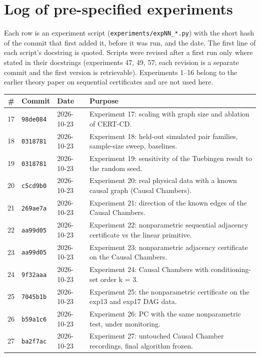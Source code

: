 \appendix

\section{Log of pre-specified experiments}\label{app:prereg}
Each row is an experiment script (\texttt{experiments/expNN\_*.py}) with the short hash of the commit that first added it, before it was run, and the date. The first line of each script's docstring is quoted. Scripts were revised after a first run only where stated in their docstrings (experiments 47, 49, 57; each revision is a separate commit and the first version is retrievable). Experiments 1--16 belong to the earlier theory paper on sequential certificates and are not used here.
\begingroup\scriptsize\setlength{\tabcolsep}{3pt}
\begin{longtable}{@{}rllp{9.8cm}@{}}
\toprule
\# & Commit & Date & Purpose\\
\midrule
\endhead
17 & \texttt{98de084} & 2026-10-23 & Experiment 17: scaling with graph size and ablation of CERT-CD.\\
18 & \texttt{0318781} & 2026-10-23 & Experiment 18: held-out simulated pair families, sample-size sweep, baselines.\\
19 & \texttt{0318781} & 2026-10-23 & Experiment 19: sensitivity of the Tuebingen result to the random seed.\\
20 & \texttt{c5cd9b0} & 2026-10-23 & Experiment 20: real physical data with a known causal graph (Causal Chambers).\\
21 & \texttt{269ae7a} & 2026-10-23 & Experiment 21: direction of the known edges of the Causal Chambers.\\
22 & \texttt{aa99d05} & 2026-10-23 & Experiment 22: nonparametric sequential adjacency certificate vs the linear primitive.\\
23 & \texttt{aa99d05} & 2026-10-23 & Experiment 23: nonparametric adjacency certificate on the Causal Chambers.\\
24 & \texttt{9f32aaa} & 2026-10-23 & Experiment 24: Causal Chambers with conditioning-set order k = 3.\\
25 & \texttt{7045b1b} & 2026-10-23 & Experiment 25: the nonparametric certificate on the exp13 and exp17 DAG data.\\
26 & \texttt{b59a1c6} & 2026-10-23 & Experiment 26: PC with the same nonparametric test, under monitoring.\\
27 & \texttt{ba2f7ac} & 2026-10-23 & Experiment 27: untouched Causal Chamber recordings, final algorithm frozen.\\

\end{longtable}

